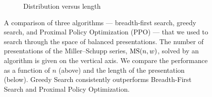 \begin{figure}
\begin{subfigure}[b]{0.5\textwidth}
		\caption{Distribution versus length}
		\label{fig:performance_vs_length}
	\end{subfigure}
	\caption{A comparison of three algorithms --- breadth-first search, greedy search, and Proximal Policy Optimization (PPO) --- that we used to search through the space of balanced presentations. The number of presentations of the Miller--Schupp series, $\text{MS}(n, w)$, solved by an algorithm is given on the vertical axis. We compare the performance as a function of $n$ (above) and the length of the presentation (below). Greedy Search consistently outperforms Breadth-First Search and Proximal Policy Optimization.}
	\label{fig:performance}
\end{figure}

